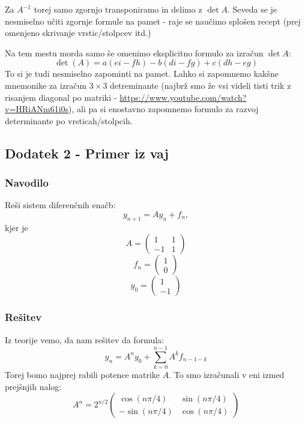 \documentclass{article}
\begin{document}
Za $A^{-1}$ torej samo zgornjo transponiramo in delimo z $\det A$. Seveda se je nesmiselno učiti zgornje formule na pamet - raje se naučimo splošen recept (prej omenjeno skrivanje vrstic/stolpcev itd.)

\noindent
Na tem mestu morda samo še omenimo eksplicitno formulo za izračun $\det A$:
\begin{equation*}
\det(A) = a(ei - fh) - b(di - fg) + c(dh - eg)
\end{equation*}
To si je tudi nesmiselno zapominti na pamet. Lahko si zapomnemo kakšne mnemonike za izračun $3 \times 3$ detreminante (najbrž smo že vsi videli tisti trik z risanjem diagonal po matriki - \href{https://www.youtube.com/watch?v=HRiANm61i0s}{https://www.youtube.com/watch?v=HRiANm61i0s}), ali pa si enostavno zapomnemo formulo za razvoj determinante po vrsticah/stolpcih.

\subsection*{Dodatek 2 - Primer iz vaj}
\subsubsection*{Navodilo}
Reši sistem diferenčnih enačb:
\begin{equation*}
y_{n+1} = A y_n + f_n,
\end{equation*}
kjer je 
\begin{equation*}
A =
\begin{pmatrix}
1 & 1 \\
-1 & 1 
\end{pmatrix}
\end{equation*}
\begin{equation*}
f_n =
\begin{pmatrix}
1  \\
0  
\end{pmatrix}
\end{equation*}
\begin{equation*}
y_0 =
\begin{pmatrix}
1  \\
-1  
\end{pmatrix}
\end{equation*}
\subsubsection*{Rešitev}
Iz teorije vemo, da nam rešitev da formula:
\begin{equation*}
y_n = A^n y_0 + \sum_{k=0}^{n-1} A^k f_{n-1-k}
\end{equation*}
Torej bomo najprej rabili potence matrike $A$. To smo izračunali v eni izmed prejšnjih nalog:
\begin{equation*}
A^n = 2^{n/2}
\begin{pmatrix}
\cos(n \pi/4) & \sin(n \pi/4) \\
-\sin(n \pi/4)  & \cos(n \pi/4)
\end{pmatrix}
\end{equation*}
\end{document}

